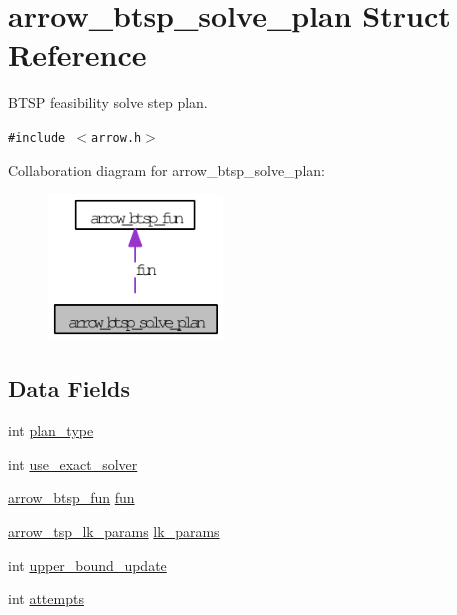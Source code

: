 \hypertarget{structarrow__btsp__solve__plan}{
\section{arrow\_\-btsp\_\-solve\_\-plan Struct Reference}
\label{structarrow__btsp__solve__plan}
}
BTSP feasibility solve step plan.  


{\tt \#include $<$arrow.h$>$}

Collaboration diagram for arrow\_\-btsp\_\-solve\_\-plan:\nopagebreak
\begin{figure}[H]
\begin{center}
\leavevmode
\includegraphics[width=131pt]{structarrow__btsp__solve__plan__coll__graph}
\end{center}
\end{figure}
\subsection*{Data Fields}
\begin{CompactItemize}
\item 
int \hyperlink{structarrow__btsp__solve__plan_527ebf95b7a2c12f174d935ded4445a9}{plan\_\-type}
\item 
int \hyperlink{structarrow__btsp__solve__plan_fed81dda6e547af712c67dc2c35b55b3}{use\_\-exact\_\-solver}
\item 
\hyperlink{structarrow__btsp__fun}{arrow\_\-btsp\_\-fun} \hyperlink{structarrow__btsp__solve__plan_89fa2ad1bcc026cd50fd7abc6c30ce3e}{fun}
\item 
\hyperlink{structarrow__tsp__lk__params}{arrow\_\-tsp\_\-lk\_\-params} \hyperlink{structarrow__btsp__solve__plan_576ea43a6d1de8f9c46f02edf2849122}{lk\_\-params}
\item 
int \hyperlink{structarrow__btsp__solve__plan_5ac6a38c297df040797c63babc4c02c3}{upper\_\-bound\_\-update}
\item 
int \hyperlink{structarrow__btsp__solve__plan_acfa3d4257a33548a9f60ee568219bc5}{attempts}
\end{CompactItemize}


